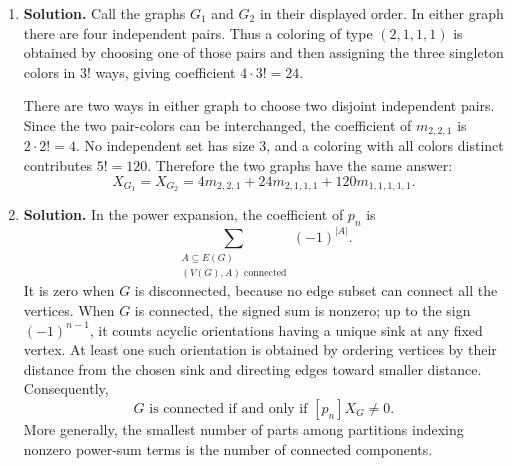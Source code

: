 \documentclass{article}
\begin{document}
\begin{enumerate}
\begin{enumerate}
\item Taking $j=k-1$, the coefficient is
\[
\boxed{-\binom{k-1}{k-2}=-(k-1).}
\]

\item For a simple graph,
\[
\boxed{[n^{k-1}]\chi_G(n)=-|E(G)|.}
\]
We prove this by induction on the number of edges.  For the graph with
no edges, $\chi_G(n)=n^k$, and both sides are $0$.  Choose an edge $e$.
By induction, the coefficient of $n^{k-1}$ in
$\chi_{G-e}(n)$ is $-(|E(G)|-1)$.  The contracted graph has $k-1$
vertices, so its chromatic polynomial is monic of degree $k-1$.
Consequently, deletion--contraction gives
\[
[n^{k-1}]\chi_G(n)
=-(|E(G)|-1)-1=-|E(G)|.
\]

\item If $\chi_G(n)=n(n-1)^{k-1}$, part (b) says that the coefficient
of $n^{k-1}$ is $-(k-1)$.  By part (c), $G$ has $k-1$ edges.  Since
$G$ is connected, a connected graph on $k$ vertices with $k-1$ edges
is a tree.
\end{enumerate}

\item \textbf{Solution.}
Call the graphs $G_1$ and $G_2$ in their displayed order.  In either
graph there are four independent pairs.  Thus a coloring of type
$(2,1,1,1)$ is obtained by choosing one of those pairs and then
assigning the three singleton colors in $3!$ ways, giving coefficient
$4\cdot3!=24$.

There are two ways in either graph to choose two disjoint independent
pairs.  Since the two pair-colors can be interchanged, the coefficient
of $m_{2,2,1}$ is $2\cdot2!=4$.  No independent set has size $3$, and
a coloring with all colors distinct contributes $5!=120$.  Therefore
the two graphs have the same answer:
\[
\boxed{X_{G_1}=X_{G_2}
=4m_{2,2,1}+24m_{2,1,1,1}+120m_{1,1,1,1,1}.}
\]

\item \textbf{Solution.}
In the power expansion, the coefficient of $p_n$ is
\[
\sum_{\substack{A\subseteq E(G)\\(V(G),A)\text{ connected}}}
(-1)^{|A|}.
\]
It is zero when $G$ is disconnected, because no edge subset can
connect all the vertices.  When $G$ is connected, the signed sum is
nonzero; up to the sign $(-1)^{n-1}$, it counts acyclic orientations
having a unique sink at any fixed vertex.  At least one such
orientation is obtained by ordering vertices by their distance from
the chosen sink and directing edges toward smaller distance.
Consequently,
\[
\boxed{G\text{ is connected if and only if }[p_n]X_G\ne0.}
\]
More generally, the smallest number of parts among partitions
indexing nonzero power-sum terms is the number of connected components.


\end{enumerate}
\end{document}
